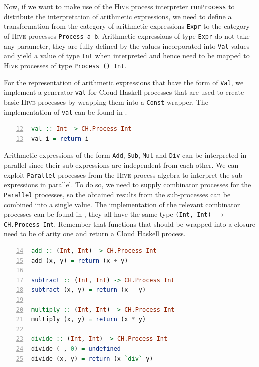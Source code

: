 Now, if we want to make use of the \textsc{Hive} process interpreter \texttt{runProcess} to distribute the interpretation of arithmetic expressions, we need to define a transformation from the category of arithmetic expressions \texttt{Expr} to the category of \textsc{Hive} processes \texttt{Process a b}. Arithmetic expressions of type \texttt{Expr} do not take any parameter, they are fully defined by the values incorporated into \texttt{Val} values and yield a value of type \texttt{Int} when interpreted and hence need to be mapped to \textsc{Hive} processes of type \texttt{Process () Int}.

For the representation of arithmetic expressions that have the form of \texttt{Val}, we implement a generator \texttt{val} for \textsf{Cloud Haskell} processes that are used to create basic \textsc{Hive} processes by wrapping them into a \texttt{Const} wrapper. The implementation of \texttt{val} can be found in .
\begin{lstlisting}[language=Haskell, caption=A generator for \textsf{Cloud Haskell} process for the representation of \texttt{Val} nodes., label=lst:arith_val, numbers=left, frame=bt, firstnumber=12]
val :: Int -> CH.Process Int
val i = return i
\end{lstlisting}

Arithmetic expressions of the form \texttt{Add}, \texttt{Sub}, \texttt{Mul} and \texttt{Div} can be interpreted in parallel since their sub-expressions are independent from each other. We can exploit \texttt{Parallel} processes from the \textsc{Hive} process algebra to interpret the sub-expressions in parallel. To do so, we need to supply combinator processes for the \texttt{Parallel} processes, so the obtained results from the sub-processes can be combined into a single value. The implementation of the relevant combinator processes can be found in , they all have the same type \texttt{(Int, Int) $\to$ CH.Process Int}. Remember that functions that should be wrapped into a closure need to be of arity one and return a \textsf{Cloud Haskell} process.
\begin{lstlisting}[language=Haskell, caption=\textsf{Cloud Haskell} processes for the combination of results from processes that have been executed in parallel., label=lst:arith_combinators,numbers=left, frame=bt, firstnumber=14]
add :: (Int, Int) -> CH.Process Int
add (x, y) = return (x + y)

subtract :: (Int, Int) -> CH.Process Int
subtract (x, y) = return (x - y)

multiply :: (Int, Int) -> CH.Process Int
multiply (x, y) = return (x * y)

divide :: (Int, Int) -> CH.Process Int
divide (_, 0) = undefined
divide (x, y) = return (x `div` y)
\end{lstlisting}

